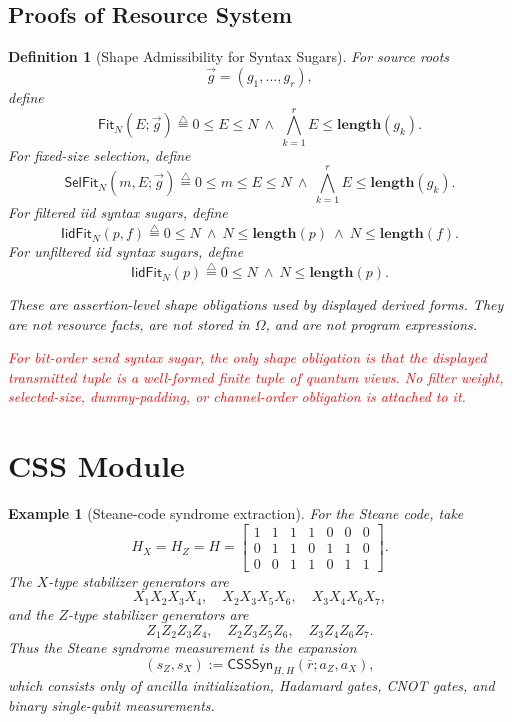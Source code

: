 \documentclass[acmsmall,screen,review,anonymous,nonacm]{acmart}
\newtheorem{definition}{Definition}[section]
\theoremstyle{defn_style}
\newtheorem{example}{Example}[section]
\begin{document}
\subsection{Proofs of Resource System}
\begin{definition}[Shape Admissibility for Syntax Sugars]
    For source roots
    \[
    \vec g=(g_1,\ldots,g_r),
    \]
    define
    \[
    \mathsf{Fit}_N(E;\vec g)
    \stackrel{\triangle}{=}
    0\le E\le N
    \ \land\
    \bigwedge_{k=1}^{r}
    E\le \mathbf{length}(g_k).
    \]
    For fixed-size selection, define
    \[
    \mathsf{SelFit}_N(m,E;\vec g)
    \stackrel{\triangle}{=}
    0\le m\le E\le N
    \ \land\
    \bigwedge_{k=1}^{r}
    E\le \mathbf{length}(g_k).
    \]
    For filtered iid syntax sugars, define
    \[
    \mathsf{IidFit}_N(p,f)
    \stackrel{\triangle}{=}
    0\le N
    \ \land\
    N\le \mathbf{length}(p)
    \ \land\
    N\le \mathbf{length}(f).
    \]
    For unfiltered iid syntax sugars, define
    \[
    \mathsf{IidFit}_N(p)
    \stackrel{\triangle}{=}
    0\le N
    \ \land\
    N\le \mathbf{length}(p).
    \]
    
    These are assertion-level shape obligations used by displayed
    derived forms. They are not resource facts, are not stored in
    \(\Omega\), and are not program expressions.
    
    \textcolor{red}{For bit-order send syntax sugar, the only shape obligation is that the displayed transmitted tuple is a well-formed finite tuple of quantum views.  No filter weight, selected-size, dummy-padding, or channel-order obligation is attached to it.}
\end{definition}
        


\section{CSS Module}

\begin{example}[Steane-code syndrome extraction]
For the Steane code, take
\[
H_X=H_Z=H
=
\begin{bmatrix}
1&1&1&1&0&0&0\\
0&1&1&0&1&1&0\\
0&0&1&1&0&1&1
\end{bmatrix}.
\]
The \(X\)-type stabilizer generators are
\[
X_1X_2X_3X_4,\quad
X_2X_3X_5X_6,\quad
X_3X_4X_6X_7,
\]
and the \(Z\)-type stabilizer generators are
\[
Z_1Z_2Z_3Z_4,\quad
Z_2Z_3Z_5Z_6,\quad
Z_3Z_4Z_6Z_7.
\]
Thus the Steane syndrome measurement is the expansion
\[
(s_Z,s_X)
:=
\mathsf{CSSSyn}_{H,H}
(\bar r;a_Z,a_X),
\]
which consists only of ancilla initialization, Hadamard gates, CNOT gates,
and binary single-qubit measurements.
\end{example}
\end{document}

